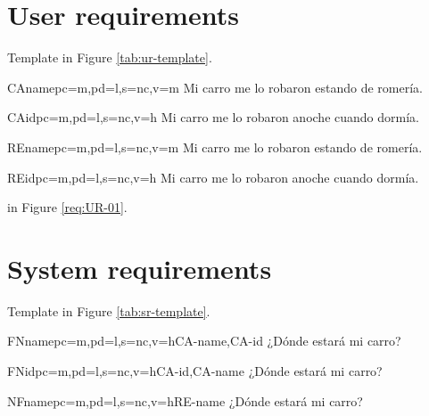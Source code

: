 \documentclass[a4paper,10pt]{article}
\begin{document}
  \section{User requirements}

  Template in Figure \ref{tab:ur-template}.

  \printureqtemplate

  \begin{userReq}{CA}{name}{pc=m,pd=l,s=nc,v=m}
    Mi carro me lo robaron estando de romería.
  \end{userReq}

  \begin{userReq}{CA}{id}{pc=m,pd=l,s=nc,v=h}
    Mi carro me lo robaron anoche cuando dormía.
  \end{userReq}

  \begin{userReq}{RE}{name}{pc=m,pd=l,s=nc,v=m}
    Mi carro me lo robaron estando de romería.
  \end{userReq}

  \begin{userReq}{RE}{id}{pc=m,pd=l,s=nc,v=h}
    Mi carro me lo robaron anoche cuando dormía.
  \end{userReq}

  \FloatBarrier

   in Figure \ref{req:UR-01}.

  \section{System requirements}
  Template in Figure \ref{tab:sr-template}.

  \printsreqtemplate

  \begin{softwareReq}{FN}{name}{pc=m,pd=l,s=nc,v=h}{CA-name,CA-id}
    ¿Dónde estará mi carro?
  \end{softwareReq}

  \begin{softwareReq}{FN}{id}{pc=m,pd=l,s=nc,v=h}{CA-id,CA-name}
    ¿Dónde estará mi carro?
  \end{softwareReq}

  \begin{softwareReq}{NF}{name}{pc=m,pd=l,s=nc,v=h}{RE-name}
    ¿Dónde estará mi carro?
  \end{softwareReq}
\end{document}

